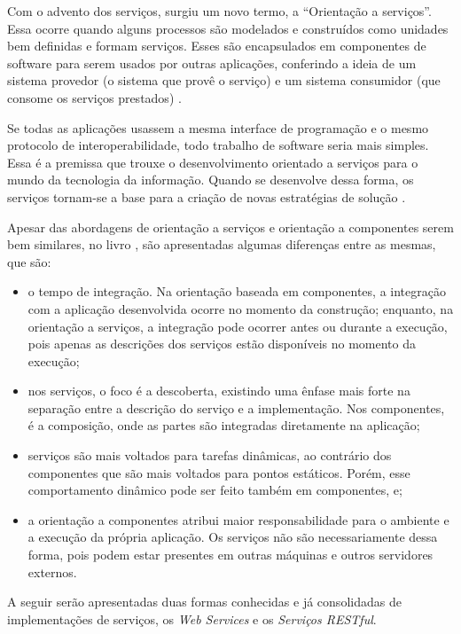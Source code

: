 \begin{apendicesenv}
Com o advento dos serviços, surgiu um novo termo, a ``Orientação a serviços''. Essa ocorre quando alguns processos são modelados e construídos como unidades bem definidas e formam serviços. Esses são encapsulados em componentes de software para serem usados por outras aplicações, conferindo a ideia de um sistema provedor (o sistema que provê o serviço) e um sistema consumidor (que consome os serviços prestados) \cite{Victorino:Brascher:2009}.

Se todas as aplicações usassem a mesma interface de programação e o mesmo protocolo de interoperabilidade, todo trabalho de software seria mais simples. Essa é a premissa que trouxe o desenvolvimento orientado a serviços para o mundo da tecnologia da informação. Quando se desenvolve dessa forma, os serviços tornam-se a base para a criação de novas estratégias de solução \cite{Newcomer:Lomow:2004}.

Apesar das abordagens de orientação a serviços e orientação a componentes serem bem similares, no livro \cite{Stojanovic:Dahanayake:2005}, são apresentadas algumas diferenças entre as mesmas, que são:

\begin{itemize}
	\item o tempo de integração. Na orientação baseada em componentes, a integração com a aplicação desenvolvida ocorre no momento da construção; enquanto, na orientação a serviços, a integração pode ocorrer antes ou durante a execução, pois apenas as descrições dos serviços estão disponíveis no momento da execução;
	\item nos serviços, o foco é a descoberta, existindo uma ênfase mais forte na separação entre a descrição do serviço e a implementação. Nos componentes, é a composição, onde as partes são integradas diretamente na aplicação;
	\item serviços são mais voltados para tarefas dinâmicas, ao contrário dos componentes que são mais voltados para pontos estáticos. Porém, esse comportamento dinâmico pode ser feito também em componentes, e;
	\item a orientação a componentes atribui maior responsabilidade para o ambiente e a execução da própria aplicação. Os serviços não são necessariamente dessa forma, pois podem estar presentes em outras máquinas e outros servidores externos.
\end{itemize}

A seguir serão apresentadas duas formas conhecidas e já consolidadas de implementações de serviços, os \textit{Web Services} e os \textit{Serviços RESTful}.


\end{apendicesenv}
